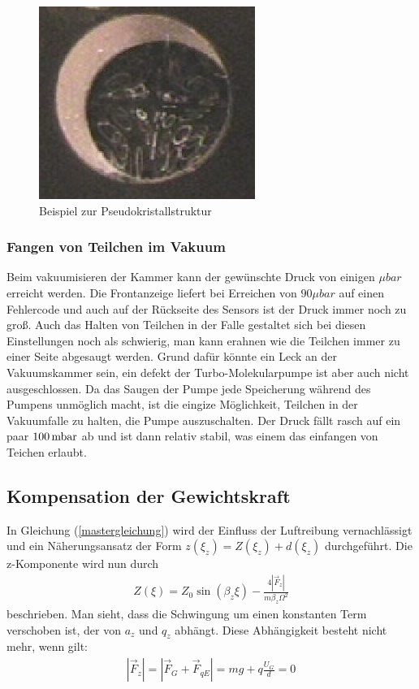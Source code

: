 \documentclass[a4paper,12pt]{article}
\begin{document}
\begin{figure}[htb]
		\centering
		\includegraphics{pseudo_kristall.png}
		\caption{Beispiel zur Pseudokristallstruktur}
		\label{pseudokristall}
\end{figure}

\subsubsection*{Fangen von Teilchen im Vakuum}
Beim vakuumisieren der Kammer kann der gewünschte Druck von einigen $\unit{μbar}$ erreicht werden.
Die Frontanzeige liefert bei Erreichen von $90μbar$ auf einen Fehlercode und auch auf der Rückseite des Sensors ist der Druck immer noch zu groß.
Auch das Halten von Teilchen in der Falle gestaltet sich bei diesen Einstellungen noch als schwierig, man kann erahnen wie die Teilchen immer zu einer Seite abgesaugt werden.
Grund dafür könnte ein Leck an der Vakuumskammer sein, ein defekt der Turbo-Molekularpumpe ist aber auch nicht ausgeschlossen.
Da das Saugen der Pumpe jede Speicherung während des Pumpens unmöglich macht, ist die eingize Möglichkeit, Teilchen in der Vakuumfalle zu halten, die Pumpe auszuschalten.
Der Druck fällt rasch auf ein paar $\unit[100] {mbar}$ ab und ist dann relativ stabil, was einem das einfangen von Teichen erlaubt.


\subsection{Kompensation der Gewichtskraft}
In Gleichung (\ref{mastergleichung}) wird der Einfluss der Luftreibung vernachlässigt und ein Näherungsansatz der Form $z(ξ_z) = Z(ξ_z)+d(ξ_z)$ durchgeführt.
Die z-Komponente wird nun durch
\begin{align*}
	Z(ξ) = Z_0\sin(β_zξ) - \frac{4|\vec{F}_z|}{mβ_zΩ^2}
\end{align*}
beschrieben.
Man sieht, dass die Schwingung um einen konstanten Term verschoben ist, der von $a_z$ und $q_z$ abhängt.
Diese Abhängigkeit besteht nicht mehr, wenn gilt:
\begin{align}
	\label{kraftgleichgew}
	|\vec{F}_{z}| = |\vec{F}_G + \vec{F}_{qE}| = mg + q\frac{U_G}{d} = 0
\end{align}
\end{document}
